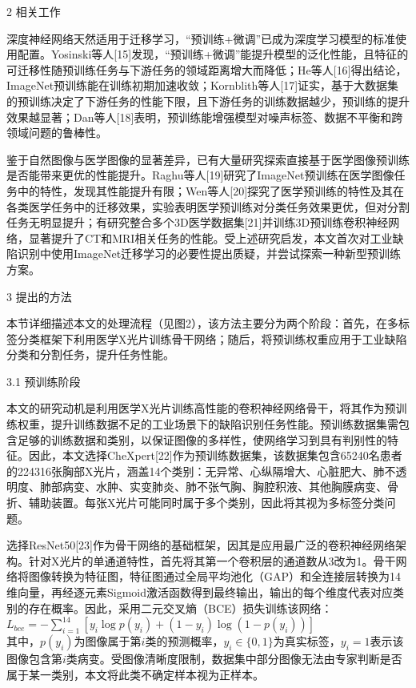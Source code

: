 2 相关工作

深度神经网络天然适用于迁移学习，``预训练+微调''已成为深度学习模型的标准使用配置。Yosinski等人{[}15{]}发现，``预训练+微调''能提升模型的泛化性能，且特征的可迁移性随预训练任务与下游任务的领域距离增大而降低；He等人{[}16{]}得出结论，ImageNet预训练能在训练初期加速收敛；Kornblith等人{[}17{]}证实，基于大数据集的预训练决定了下游任务的性能下限，且下游任务的训练数据越少，预训练的提升效果越显著；Dan等人{[}18{]}表明，预训练能增强模型对噪声标签、数据不平衡和跨领域问题的鲁棒性。

鉴于自然图像与医学图像的显著差异，已有大量研究探索直接基于医学图像预训练是否能带来更优的性能提升。Raghu等人{[}19{]}研究了ImageNet预训练在医学图像任务中的特性，发现其性能提升有限；Wen等人{[}20{]}探究了医学预训练的特性及其在各类医学任务中的迁移效果，实验表明医学预训练对分类任务效果更优，但对分割任务无明显提升；有研究整合多个3D医学数据集{[}21{]}并训练3D预训练卷积神经网络，显著提升了CT和MRI相关任务的性能。受上述研究启发，本文首次对工业缺陷识别中使用ImageNet迁移学习的必要性提出质疑，并尝试探索一种新型预训练方案。

3 提出的方法

本节详细描述本文的处理流程（见图2），该方法主要分为两个阶段：首先，在多标签分类框架下利用医学X光片训练骨干网络；随后，将预训练权重应用于工业缺陷分类和分割任务，提升任务性能。

3.1 预训练阶段

本文的研究动机是利用医学X光片训练高性能的卷积神经网络骨干，将其作为预训练权重，提升训练数据不足的工业场景下的缺陷识别任务性能。预训练数据集需包含足够的训练数据和类别，以保证图像的多样性，使网络学习到具有判别性的特征。因此，本文选择CheXpert{[}22{]}作为预训练数据集，该数据集包含65240名患者的224316张胸部X光片，涵盖14个类别：无异常、心纵隔增大、心脏肥大、肺不透明度、肺部病变、水肿、实变肺炎、肺不张气胸、胸腔积液、其他胸膜病变、骨折、辅助装置。每张X光片可能同时属于多个类别，因此将其视为多标签分类问题。

选择ResNet50{[}23{]}作为骨干网络的基础框架，因其是应用最广泛的卷积神经网络架构。针对X光片的单通道特性，首先将其第一个卷积层的通道数从3改为1。骨干网络将图像转换为特征图，特征图通过全局平均池化（GAP）和全连接层转换为14维向量，再经逐元素Sigmoid激活函数得到最终输出，输出的每个维度代表对应类别的存在概率。因此，采用二元交叉熵（BCE）损失训练该网络：\\
\(L_{bce }=-\sum_{i=1}^{14}\left[y_{i} \log p\left(y_{i}\right)+\left(1-y_{i}\right) \log \left(1-p\left(y_{i}\right)\right)\right]\)\\
其中，\(p(y_{i})\)为图像属于第\(i\)类的预测概率，\(y_{i} \in\{0,1\}\)为真实标签，\(y_{i}=1\)表示该图像包含第\(i\)类病变。受图像清晰度限制，数据集中部分图像无法由专家判断是否属于某一类别，本文将此类不确定样本视为正样本。

